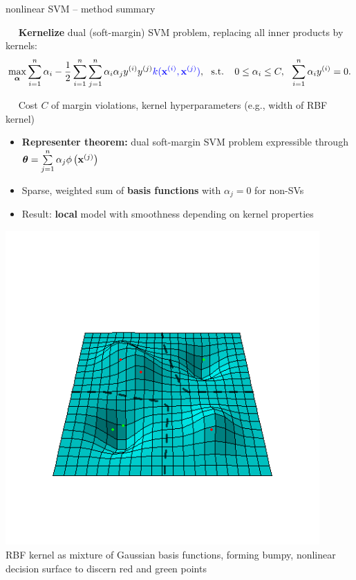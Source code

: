 \begin{frame}{nonlinear SVM -- method summary}

\footnotesize

 ~~ \textbf{Kernelize} dual (soft-margin) SVM problem, 
replacing all inner products by kernels:
$$\max_{\alphav} \sumin \alpha_i - \frac{1}{2}\sumin \sumjn
\alpha_i\alpha_j\yi y^{(j)} \textcolor{blue}{k(\xi, \xi[j])}, ~~ \text{s.t. } ~~ 
0 \le \alpha_i \le C, ~~ \sumin \alpha_i \yi = 0.
$$

\medskip

 ~~ Cost $C$ of margin violations, kernel 
hyperparameters (e.g., width of RBF kernel)

\medskip


\begin{minipage}[c]{0.5\textwidth}

  \begin{itemize}
    \item \textbf{Representer theorem:} dual soft-margin SVM problem expressible 
    through 
    $\thetab = \sumjn \alpha_j \phi \left(\xi[j] \right)$ \\
    \item Sparse, weighted sum of \textbf{basis functions} with $\alpha_j = 0$ 
    for non-SVs
    \item Result: \textbf{local} model with smoothness depending on kernel 
    properties
  \end{itemize}
\end{minipage}
\hfill
\begin{minipage}[c]{0.4\textwidth}
  \centering
  \includegraphics[width=0.9\textwidth, trim=0 70 0 100, clip]{
  figure/svm_rbf_as_basis.png} \\
  \tiny{RBF kernel as mixture of Gaussian basis functions, forming
  bumpy, nonlinear decision surface to discern red and green points}
\end{minipage}

\end{frame}

